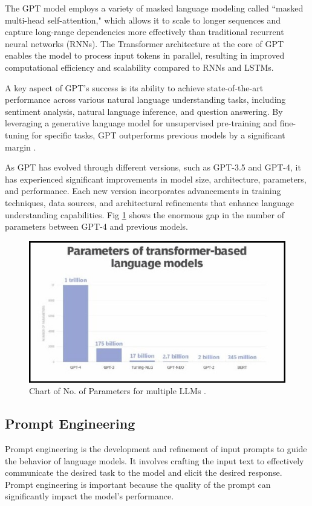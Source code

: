 The GPT model employs a variety of masked language modeling called ``masked multi-head self-attention," which allows it to scale to longer sequences and capture long-range dependencies more effectively than traditional recurrent neural networks (RNNs). The Transformer architecture at the core of GPT enables the model to process input tokens in parallel, resulting in improved computational efficiency and scalability compared to RNNs and LSTMs.

A key aspect of GPT's success is its ability to achieve state-of-the-art performance across various natural language understanding tasks, including sentiment analysis, natural language inference, and question answering. By leveraging a generative language model for unsupervised pre-training and fine-tuning for specific tasks, GPT outperforms previous models by a significant margin \cite{radford_narasimhan_salimans_sutskever}.

As GPT has evolved through different versions, such as GPT-3.5 and GPT-4, it has experienced significant improvements in model size, architecture, parameters, and performance. Each new version incorporates advancements in training techniques, data sources, and architectural refinements that enhance language understanding capabilities. Fig \ref{fig:3.4} shows the enormous gap in the number of parameters between GPT-4 and previous models.

\begin{figure}[H]
\begin{center}
\includegraphics[width=0.8\linewidth]{Honors_Thesis/Figures/3.4.jpg}
\end{center}
\caption{Chart of No. of Parameters for multiple LLMs \cite{kerner_2023}.}
\label{fig:3.4}
\end{figure}

\subsection{Prompt Engineering}
Prompt engineering is the development and refinement of input prompts to guide the behavior of language models. It involves crafting the input text to effectively communicate the desired task to the model and elicit the desired response. Prompt engineering is important because the quality of the prompt can significantly impact the model's performance.

